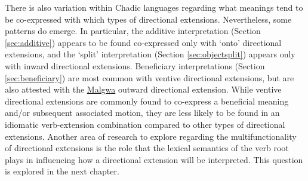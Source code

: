 There is also variation within Chadic languages regarding what meanings tend to be co-expressed with which types of directional extensions. Nevertheless, some patterns do emerge. In particular, the additive interpretation (Section \ref{sec:additive}) appears to be found co-expressed only with `onto' directional extensions, and the `split' interpretation (Section \ref{sec:objectsplit}) appears only with inward directional extensions. Beneficiary interpretations (Section \ref{sec:beneficiary}) are most common with ventive directional extensions, but are also attested with the \hyperref[malg]{Malgwa} outward directional extension. While ventive directional extensions are commonly found to co-express a beneficial meaning and/or subsequent associated motion, they are less likely to be found in an idiomatic verb-extension combination compared to other types of directional extensions. Another area of research to explore regarding the multifunctionality of directional extensions is the role that the lexical semantics of the verb root plays in influencing how a directional extension will be interpreted. This question is explored in the next chapter. 


